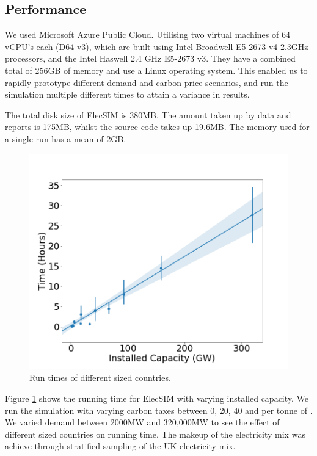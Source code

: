 \subsection{Performance}

 We used Microsoft Azure Public Cloud. Utilising two virtual machines of 64 vCPU's each (D64 v3), which are built using Intel Broadwell E5-2673 v4 2.3GHz processors, and the Intel Haswell 2.4 GHz E5-2673 v3. They have a combined total of 256GB of memory and use a Linux operating system. This enabled us to rapidly prototype different demand and carbon price scenarios, and run the simulation multiple different times to attain a variance in results.

The total disk size of ElecSIM is 380MB. The amount taken up by data and reports is 175MB, whilst the source code takes up 19.6MB. The memory used for a single run has a mean of 2GB.


\begin{figure}
	\centering
	\includegraphics[width=1\linewidth]{figures/timing_plot}
	\caption{Run times of different sized countries.}
	\label{fig:timingplot}
\end{figure}

Figure \ref{fig:timingplot} shows the running time for ElecSIM with varying installed capacity. We run the simulation with varying carbon taxes between 0, 20, 40 and  per tonne of . We varied demand between 2000MW and 320,000MW to see the effect of different sized countries on running time. The makeup of the electricity mix was achieve through stratified sampling of the UK electricity mix. 


